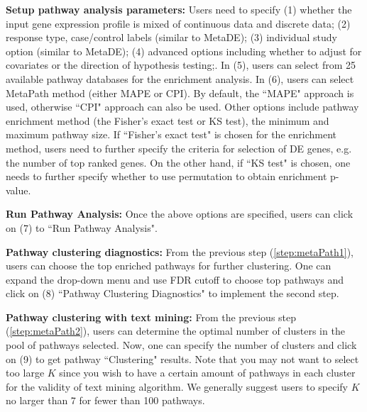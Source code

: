 \begin{steps}
\item \textbf{Setup pathway analysis parameters:}
Users need to specify {\color{red}(1)} whether the input gene expression profile is mixed of continuous data and discrete data;
{\color{red}(2)} response type, case/control labels (similar to MetaDE);
{\color{red}(3)} individual study option (similar to MetaDE);
{\color{red}(4)} advanced options including whether to adjust for covariates or the direction of hypothesis testing;.
In {\color{red}(5)}, users can select from 25 available pathway databases for the enrichment analysis.
In {\color{red}(6)}, users can select MetaPath method (either MAPE or CPI).
By default, the ``MAPE" approach is used, otherwise ``CPI" approach can also be used. Other options include pathway enrichment method (the Fisher's exact test or KS test), the minimum and maximum pathway size. If ``Fisher's exact test" is chosen for the enrichment method, users need to further specify the criteria for selection of DE genes, e.g. the number of top ranked genes. On the other hand, if ``KS test" is chosen, one needs to further specify whether to use permutation to obtain enrichment p-value. 

\item \textbf{Run Pathway Analysis:}
\label{step:metaPath1}
Once the above options are specified, users can click on {\color{red}(7)} to ``Run Pathway Analysis".

\item \textbf{Pathway clustering diagnostics:} 
\label{step:metaPath2}
From the previous step (\ref{step:metaPath1}), users can choose the top enriched pathways for further clustering. 
One can expand the drop-down menu and use FDR cutoff to choose top pathways and click on {\color{red}(8)} ``Pathway Clustering Diagnostics" to implement the second step.

\item \textbf{Pathway clustering with text mining:} 
\label{step:metaPath3}
From the previous step (\ref{step:metaPath2}), users can determine the optimal number of clusters in the pool of pathways selected. 
Now, one can specify the number of clusters and click on {\color{red}(9)} to get pathway ``Clustering" results. 
Note that you may not want to select too large $K$ since you wish to have a certain amount of pathways in each cluster for the validity of text mining algorithm. 
We generally suggest users to specify $K$ no larger than 7 for fewer than 100 pathways. 
\end{steps}





